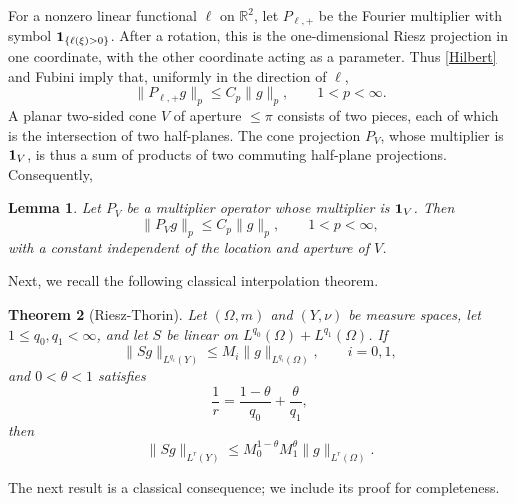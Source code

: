 \documentclass{amsart}
\numberwithin{equation}{section}
\newtheorem{theorem}{Theorem}[section]
\newtheorem{lemma}[theorem]{Lemma}
\newcommand{\R}{\mathbb{R}}
\newcommand{\Id}{{\bf 1}}
\begin{document}
For a nonzero linear functional $\ell$ on $\R^2$, let $P_{\ell,+}$ be the Fourier multiplier with symbol $\Id_{\{\ell(\xi)>0\}}$. 
After a rotation, this is the one-dimensional Riesz projection in one coordinate, with the other coordinate acting as a parameter. 
Thus \eqref{Hilbert} and Fubini imply that, 
uniformly in the direction of $\ell$,
\begin{equation}
    \nonumber
    \|P_{\ell,+}g\|_{p}\leq C_p\|g\|_{p},\qquad 1<p<\infty.
\end{equation}
A planar two-sided cone $V$ of aperture $\leq \pi$ consists of two pieces, each of which is the intersection of two half-planes. 
The cone projection $P_V$, whose multiplier is $\Id_V$, is thus a sum of products of two commuting half-plane projections. 
Consequently,

\begin{lemma}
    \label{cone-multi-lem}
    Let $P_V$ be a multiplier operator whose multiplier is $\Id_V$.
    Then
    \begin{equation}
        \label{eq:cone-projection}
        \|P_V g\|_{p}\leq C_p\|g\|_{p},\qquad 1<p<\infty,
    \end{equation}
    with a constant independent of the location and aperture of $V$.
\end{lemma}



\medskip

Next, we recall the following classical interpolation theorem.

\begin{theorem}[Riesz-Thorin]
    Let $(\Omega,m)$ and $(Y,\nu)$ be measure spaces, let $1\leq q_0,q_1<\infty$, and let $S$ be linear on $L^{q_0}(\Omega)+L^{q_1}(\Omega)$. 
    If
    \[
    \|Sg\|_{L^{q_i}(Y)}\leq M_i\|g\|_{L^{q_i}(\Omega)},\qquad i=0,1,
    \]
    and $0<\theta<1$ satisfies
    \[
    \frac1r=\frac{1-\theta}{q_0}+\frac\theta{q_1},
    \]
    then
    \[
    \|Sg\|_{L^r(Y)}\leq M_0^{1-\theta}M_1^\theta\|g\|_{L^r(\Omega)}.
    \]
\end{theorem}
The next result is a classical consequence; we include its proof for completeness.
\end{document}
